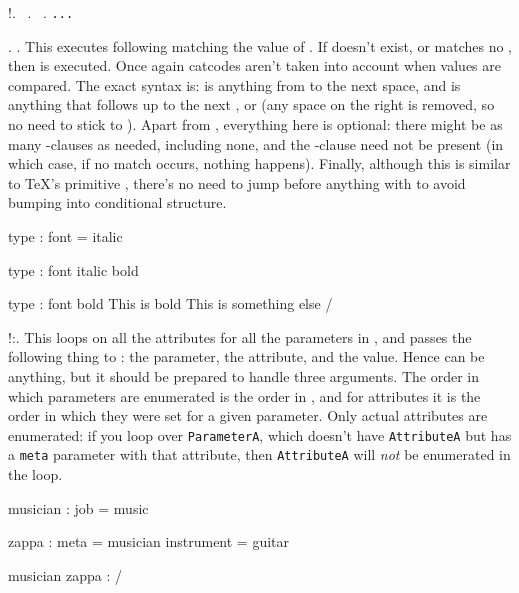 \describe*!\ifcasevalue\paramatt.
  \describe\val\value\ \codarg.
  \describe\val\value\ \codarg.
          \verb/.../ \par\noindent
  \describe\elseval \codarg.
  \describe\endval\relax.
This executes \codarg following \value matching
the value of \paramatt. If \paramatt doesn't exist, or
matches no \value, then \com\elseval is executed. Once again
catcodes aren't taken into account when values are compared.
The exact syntax is: \value is anything from \com\val to the
next space, and \codarg is anything that follows up to the next
\com\val, \com\elseval or \com\endval (any space on the right
is removed, so no need to stick \com\val to \codarg).
Apart from \com\endval, everything here is optional: there might
be as many \com\val-clauses as needed, including none, and the
\com\elseval-clause need not be present (in which case, if no
match occurs, nothing happens). Finally, although this is
similar to \TeX's primitive \com\ifcase, there's no need
to jump before anything with \com\expandafter to avoid
bumping into conditional structure. 

\Example
\def\doitalic#1{{\it#1}}
\setparameter type : font = italic \par
\ifcasevalue type : font
  \val italic \doitalic
  \val bold   \dobold
{}

\edef\foo{%
  \ifcasevalue type : font
    \val bold This is bold
    \elseval  This is something else
  \endval}
\meaning\foo
\Example/



\describe*!\parameterloop\paralist:.
This loops on all the attributes for all the parameters in \paralist,
and passes the following thing to : the parameter, the attribute,
and the value. Hence  can be anything, but it should be prepared
to handle three arguments. The order in which parameters are enumerated is the
order in \paralist, and for attributes it is the order in which they were set
for a given parameter. Only actual attributes are enumerated: if you loop over
\verb"ParameterA", which doesn't have \verb"AttributeA" but has a \verb"meta"
parameter with that attribute, then \verb"AttributeA" will \emph{not} be
enumerated in the loop.

\Example
\setparameter musician : job = music\par
\setparameter zappa :
  meta       = musician
  instrument = guitar

\def\showvalues#1#2#3{#1 : #2 = #3\par}
\parameterloop musician zappa : \showvalues
\Example/


